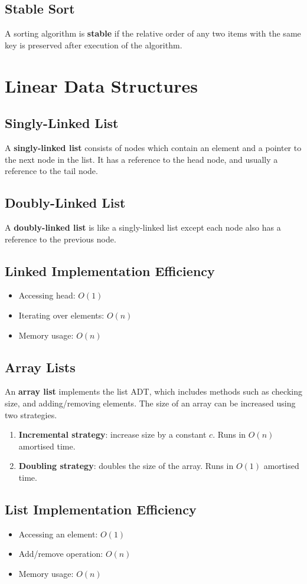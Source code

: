 \documentclass[12pt]{extarticle}
\newcommand{\N}{\newline\newline}
\begin{document}
	\subsection{Stable Sort}
	A sorting algorithm is \textbf{stable} if the relative order of any two items with the same key is preserved after execution of the algorithm.\N
	\section{Linear Data Structures}
	\subsection{Singly-Linked List}
	A \textbf{singly-linked list} consists of nodes which contain an element and a pointer to the next node in the list. It has a reference to the head node, and usually a reference to the tail node.
	\subsection{Doubly-Linked List}
	A \textbf{doubly-linked list} is like a singly-linked list except each node also has a reference to the previous node.
	\subsection{Linked Implementation Efficiency}
	\begin{itemize}
		\item Accessing head: $O(1)$
		\item Iterating over elements: $O(n)$
		\item Memory usage: $O(n)$		
	\end{itemize}
	\subsection{Array Lists}
	An \textbf{array list} implements the list ADT, which includes methods such as checking size, and adding/removing elements.\N
	The size of an array can be increased using two strategies.
	\begin{enumerate}
		\item \textbf{Incremental strategy}: increase size by a constant $c$. Runs in $O(n)$ amortised time.
		\item \textbf{Doubling strategy}: doubles the size of the array. Runs in $O(1)$ amortised time.
	\end{enumerate}
	\subsection{List Implementation Efficiency}
	\begin{itemize}
		\item Accessing an element: $O(1)$
		\item Add/remove operation: $O(n)$
		\item Memory usage: $O(n)$		
	\end{itemize}
\end{document}
